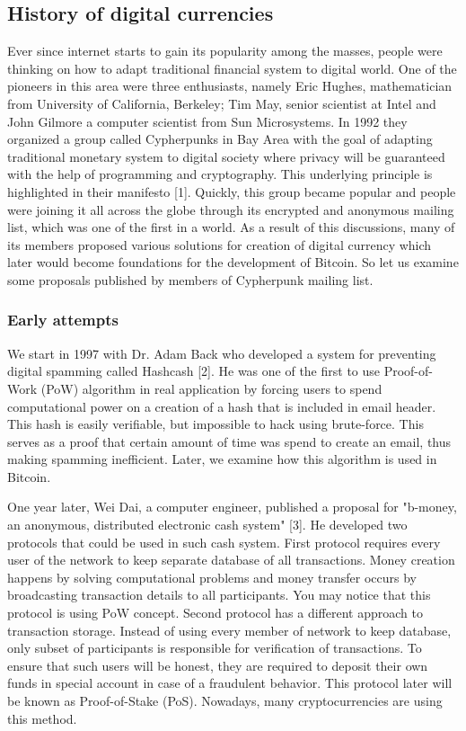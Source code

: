 \documentclass[conference,compsoc]{IEEEtran}
\begin{document}
\subsection{History of digital currencies}
Ever since internet starts to gain its popularity among the masses, people were thinking on how to adapt traditional financial system to digital world. 
One of the pioneers in this area were three enthusiasts, namely Eric Hughes, mathematician from University of California, Berkeley; Tim May, senior scientist at Intel and John Gilmore a computer scientist from Sun Microsystems. 
In 1992 they organized a group called Cypherpunks in Bay Area with the goal of adapting traditional monetary system to digital society where privacy will be guaranteed with the help of programming and cryptography. 
This underlying principle is highlighted in their manifesto [1].
Quickly, this group became popular and people were joining it all across the globe through its encrypted and anonymous mailing list, which was one of the first in a world. 
As a result of this discussions, many of its members proposed various solutions for creation of digital currency which later would become foundations for the development of Bitcoin. 
So let us examine some proposals published by members of Cypherpunk mailing list.

\subsubsection{Early attempts}
We start in 1997 with Dr. Adam Back who developed a system for preventing digital spamming called Hashcash [2]. 
He was one of the first to use Proof-of-Work (PoW) algorithm in real application by forcing users to spend computational power on a creation of a hash that is included in email header. 
This hash is easily verifiable, but impossible to hack using brute-force. 
This serves as a proof that certain amount of time was spend to create an email, thus making spamming inefficient. 
Later, we examine how this algorithm is used in Bitcoin. 

One year later, Wei Dai, a computer engineer, published a proposal for "b-money, an anonymous, distributed electronic cash system" [3]. He developed two protocols that could be used in such cash system. First protocol requires every user of the network to keep separate database of all transactions. Money creation happens by solving computational problems and money transfer occurs by broadcasting transaction details to all participants. You may notice that this protocol is using PoW concept. Second protocol has a different approach to transaction storage. Instead of using every member of network to keep database, only subset of participants is responsible for verification of transactions. To ensure that such users will be honest, they are required to deposit their own funds in special account in case of a fraudulent behavior. This protocol later will be known as Proof-of-Stake (PoS). Nowadays, many cryptocurrencies are using this method. 
\end{document}
